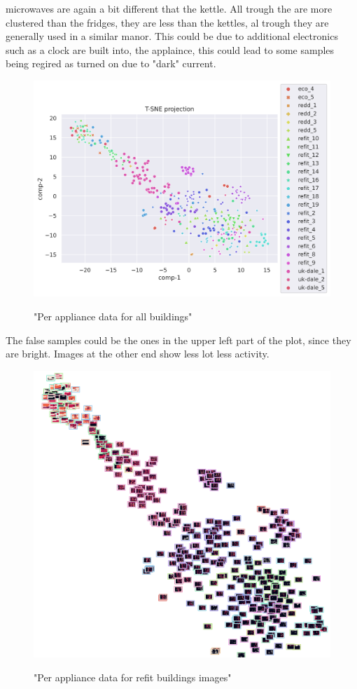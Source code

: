 microwaves are again a bit different that the kettle. All trough the are more 
clustered than the fridges, they are less than the kettles, al trough 
they are generally used in a similar manor.
This could be due to additional electronics such as a clock are built into,
the applaince, this could lead to some samples being regired as turned on due to 
"dark" current. 

\begin{figure}[H]
	\centering
	\caption{"Per appliance data for all buildings"}
	\includegraphics[width=1.2\textwidth]{Figures/TSNE/TSNE_per_appliance/all/scatter_all_microwave.png}
	\label{fig:tsne_pa_scatter_all_microwave}
\end{figure}

The false samples could be the ones in the upper left part of the plot, since they are bright.
Images at the other end show less lot less activity.

\begin{figure}[H]
	\centering
	\caption{"Per appliance data for refit buildings images"}
	\includegraphics[width=.9\textwidth]{Figures/TSNE/TSNE_per_appliance/all/img_scatter_allmicrowave.png}
	\label{fig:tsne_pa_img_scatter_all_microwave}
\end{figure}

